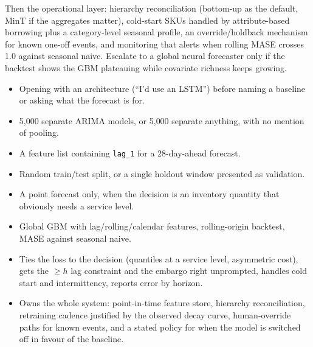 \begin{interviewq}
Then the operational layer: hierarchy reconciliation (bottom-up as the default, MinT if the aggregates matter), cold-start SKUs handled by attribute-based borrowing plus a category-level seasonal profile, an override/holdback mechanism for known one-off events, and monitoring that alerts when rolling MASE crosses 1.0 against seasonal naive. Escalate to a global neural forecaster only if the backtest shows the GBM plateauing while covariate richness keeps growing.

\redflags
\begin{itemize}
    \item Opening with an architecture (``I'd use an LSTM'') before naming a baseline or asking what the forecast is for.
    \item 5{,}000 separate ARIMA models, or 5{,}000 separate anything, with no mention of pooling.
    \item A feature list containing \texttt{lag\_1} for a 28-day-ahead forecast.
    \item Random train/test split, or a single holdout window presented as validation.
    \item A point forecast only, when the decision is an inventory quantity that obviously needs a service level.
\end{itemize}


\goodgreat
\begin{itemize}
    \item {} Global GBM with lag/rolling/calendar features, rolling-origin backtest, MASE against seasonal naive.
    \item {} Ties the loss to the decision (quantiles at a service level, asymmetric cost), gets the $\ge h$ lag constraint and the embargo right unprompted, handles cold start and intermittency, reports error by horizon.
    \item {} Owns the whole system: point-in-time feature store, hierarchy reconciliation, retraining cadence justified by the observed decay curve, human-override paths for known events, and a stated policy for when the model is switched off in favour of the baseline.
\end{itemize}

\end{interviewq}

